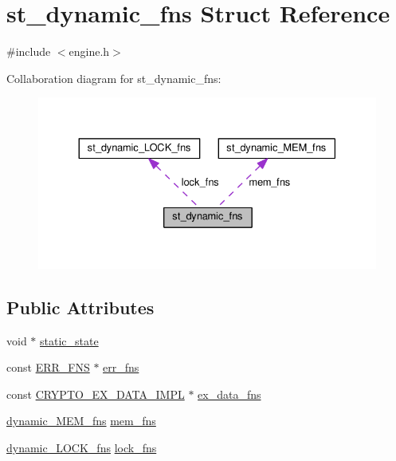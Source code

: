 \hypertarget{structst__dynamic__fns}{}\section{st\+\_\+dynamic\+\_\+fns Struct Reference}
\label{structst__dynamic__fns}


{\ttfamily \#include $<$engine.\+h$>$}



Collaboration diagram for st\+\_\+dynamic\+\_\+fns\+:
\nopagebreak
\begin{figure}[H]
\begin{center}
\leavevmode
\includegraphics[width=330pt]{structst__dynamic__fns__coll__graph}
\end{center}
\end{figure}
\subsection*{Public Attributes}
\begin{DoxyCompactItemize}
\item 
void $\ast$ \hyperlink{structst__dynamic__fns_abaade597a7f70ea7b75c4ad2f656fb92}{static\+\_\+state}
\item 
const \hyperlink{ossl__typ_8h_a10b7dacb50be04639fd1cb4f3b7198a9}{E\+R\+R\+\_\+\+F\+NS} $\ast$ \hyperlink{structst__dynamic__fns_a01d513d12727c5a3f86e6b7370476197}{err\+\_\+fns}
\item 
const \hyperlink{crypto_8h_a52be5518c28d0ef05f97c978a9fde2e4}{C\+R\+Y\+P\+T\+O\+\_\+\+E\+X\+\_\+\+D\+A\+T\+A\+\_\+\+I\+M\+PL} $\ast$ \hyperlink{structst__dynamic__fns_abf1fdf43c6222c63ea213bddd9163886}{ex\+\_\+data\+\_\+fns}
\item 
\hyperlink{engine_8h_a2b06e488f6d34900633783c7ff4b12b5}{dynamic\+\_\+\+M\+E\+M\+\_\+fns} \hyperlink{structst__dynamic__fns_a337f97c16bdfd0bbe3e4432fa32b29c4}{mem\+\_\+fns}
\item 
\hyperlink{engine_8h_a565954d93bcb51b49d06cad8ddf874cd}{dynamic\+\_\+\+L\+O\+C\+K\+\_\+fns} \hyperlink{structst__dynamic__fns_a95857186710500c6c349a79f22ac5b05}{lock\+\_\+fns}
\end{DoxyCompactItemize}


